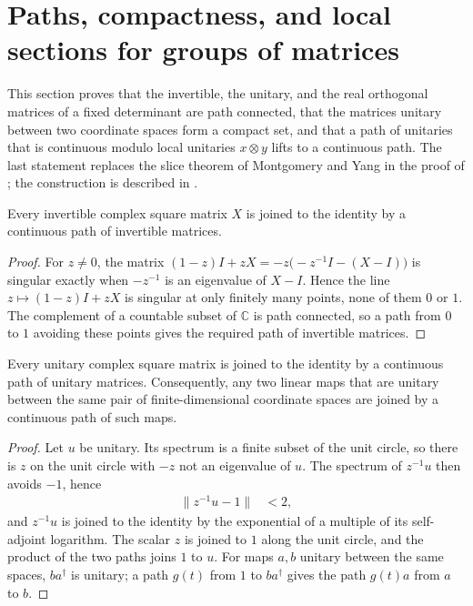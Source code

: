 \section{Paths, compactness, and local sections for groups of matrices}

This section proves that the invertible, the unitary, and the real orthogonal
matrices of a fixed determinant are path connected, that the matrices unitary
between two coordinate spaces form a compact set, and that a path of unitaries
that is continuous modulo local unitaries $x\otimes y$ lifts to a continuous
path. The last statement replaces the slice theorem of Montgomery and Yang in
the proof of \cite[Corollary~IV.7]{Cirac2017MPU}; the construction is
described in \cite{gap:mpu_standard_form_path_cross_section}.

\begin{lemma}
    \label{lem:invertible_matrices_joined}
    \leanok
    Every invertible complex square matrix $X$ is joined to the identity by a
    continuous path of invertible matrices.
\end{lemma}

\begin{proof}
    \leanok
    For $z\neq0$, the matrix $(1-z)I+zX=-z\bigl(-z^{-1}I-(X-I)\bigr)$ is
    singular exactly when $-z^{-1}$ is an eigenvalue of $X-I$. Hence the
    line $z\mapsto(1-z)I+zX$ is singular at only finitely many points, none of
    them $0$ or $1$. The complement of a countable subset of $\mathbb C$ is
    path connected, so a path from $0$ to $1$ avoiding these points gives the
    required path of invertible matrices.
\end{proof}

\begin{lemma}
    \label{lem:unitary_matrices_joined}
    \leanok
    Every unitary complex square matrix is joined to the identity by a
    continuous path of unitary matrices. Consequently, any two linear maps
    that are unitary between the same pair of finite-dimensional coordinate
    spaces are joined by a continuous path of such maps.
\end{lemma}

\begin{proof}
    \leanok
    Let $u$ be unitary. Its spectrum is a finite subset of the unit circle,
    so there is $z$ on the unit circle with $-z$ not an eigenvalue of $u$.
    The spectrum of $z^{-1}u$ then avoids $-1$, hence
    \begin{align}
        \|z^{-1}u-1\| & <2,
    \end{align}
    and $z^{-1}u$ is joined to the identity by the exponential of a
    multiple of its self-adjoint logarithm. The scalar $z$ is joined to $1$
    along the unit circle, and the product of the two paths joins $1$ to
    $u$. For maps $a,b$ unitary between the same spaces, $ba^\dagger$ is
    unitary; a path $g(t)$ from $1$ to $ba^\dagger$ gives the path $g(t)a$
    from $a$ to $b$.
\end{proof}

